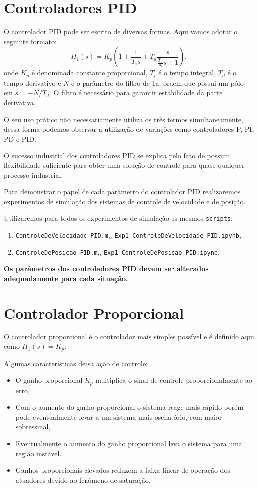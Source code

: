 \documentclass[10pt]{article}
\theoremstyle{plain}
\begin{document}
\section{Controladores PID}

O controlador PID pode ser escrito de diversas formas. Aqui vamos adotar o seguinte formato:
\begin{equation}
H_1(s) = K_p\left( 1 + \frac{1}{T_is}+T_d\frac{s}{\frac{T_d}{N}s+1} \right),
\end{equation}
onde $K_p$ é denominada constante proporcional, $T_i$ é o tempo integral, $T_d$ é o tempo derivativo e
$N$ é o parâmetro do filtro de 1a. ordem que possui um pólo em $s=-N/T_d$.
O filtro é necessário para garantir estabilidade da parte derivativa.

O seu uso prático não necessariamente utiliza os três termos simultaneamente, dessa forma  podemos
observar a utilização de variações como controladores P, PI, PD e PID.

O sucesso industrial dos controladores PID se explica pelo fato de possuir flexibilidade suficiente para
obter uma solução de controle para quase qualquer processo industrial.

Para demonstrar o papel de cada parâmetro do controlador PID realizaremos experimentos de simulação
dos sistemas de controle de velocidade e de posição.

Utilizaremos para todos os experimentos de simulação os mesmos {\tt scripts}:
\begin{enumerate}
	\item {\tt ControleDeVelocidade\_PID.m},,\; {\tt Exp1\_ControleDeVelocidade\_PID.ipynb},
	\item {\tt ControleDePosicao\_PID.m},,\; {\tt Exp1\_ControleDePosicao\_PID.ipynb}.
\end{enumerate}
{\bf Os parâmetros dos controladores PID devem ser alterados adequadamente para cada situação.}

\section{Controlador Proporcional}

O controlador proporcional é o controlador mais simples possível e é definido aqui como
$H_1(s)=K_p$.

Algumas características dessa ação de controle:
\begin{itemize}
\item O ganho proporcional $K_p$ multiplica o sinal de controle proporcionalmente ao erro,
\item Com o aumento do ganho proporcional o sistema reage mais rápido porém pode eventualmente
      levar  a um sistema mais oscilatório, com maior sobressinal,
\item Eventualmente o aumento do ganho proporcional leva o sistema para uma região instável.
\item Ganhos proporcionais elevados reduzem a faixa linear de operação dos atuadores devido ao
      fenômeno de saturação.
\end{itemize}
\end{document}
